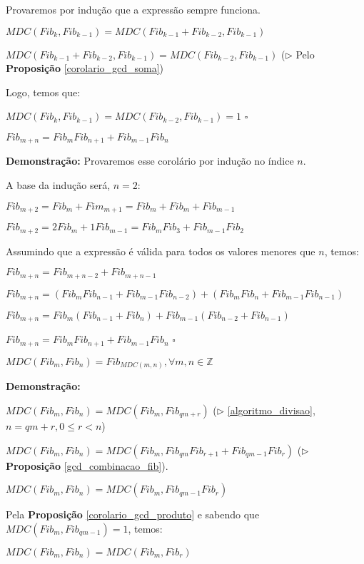 Provaremos por indução que a expressão sempre funciona.

$MDC(Fib_{k}, Fib_{k-1}) = MDC(Fib_{k-1} + Fib_{k-2}, Fib_{k-1})$

$MDC(Fib_{k-1} + Fib_{k-2}, Fib_{k-1}) = MDC(Fib_{k-2}, Fib_{k-1})$ ($\triangleright$ Pelo \textbf{Proposição} \autoref{corolario_gcd_soma})

Logo, temos que:

$MDC(Fib_{k}, Fib_{k-1}) = MDC(Fib_{k-2}, Fib_{k-1}) = 1$ $\square$



\begin{proposition}\label{gcd_combinacao_fib}
$Fib_{m+n} = Fib_mFib_{n+1} + Fib_{m-1}Fib_n$
\end{proposition}
\textbf{Demonstração:} Provaremos esse corolário por indução no índice $n$.

A base da indução será, $n=2$:

$Fib_{m+2} = Fib_m + Fim_{m+1} = Fib_m + Fib_m + Fib_{m-1}$

$Fib_{m+2} = 2Fib_m + 1Fib_{m-1} = Fib_mFib_{3} + Fib_{m-1}Fib_2$

Assumindo que a expressão é válida para todos os valores menores que $n$, temos:

$Fib_{m+n} = Fib_{m+n-2} + Fib_{m+n-1}$

$Fib_{m+n} = (Fib_{m}Fib_{n-1} + Fib_{m-1}Fib_{n-2}) + (Fib_{m}Fib_{n} + Fib_{m-1}Fib_{n-1})$

$Fib_{m+n} = Fib_m(Fib_{n-1} + Fib_{n}) + Fib_{m-1}(Fib_{n-2} + Fib_{n-1})$

$Fib_{m+n} = Fib_mFib_{n+1} + Fib_{m-1}Fib_n$ $\square$ 


\begin{theorem}\label{fibonacci_mdc}
$MDC(Fib_m, Fib_n) = Fib_{MDC(m, n)}, \forall m, n \in \mathbb{Z}$
\end{theorem}
\textbf{Demonstração:}

$MDC(Fib_m, Fib_n) = MDC(Fib_m, Fib_{qm + r})$ ($\triangleright$ \autoref{algoritmo_divisao}, $n = qm + r, 0 \leq r < n$)

$MDC(Fib_m, Fib_n) = MDC(Fib_m, Fib_{qm}Fib_{r+1} + Fib_{qm-1}Fib_{r})$ ($\triangleright$ \textbf{Proposição} \autoref{gcd_combinacao_fib}).

$MDC(Fib_m, Fib_n) = MDC(Fib_m, Fib_{qm-1}Fib_{r})$

Pela \textbf{Proposição} \autoref{corolario_gcd_produto} e sabendo que $MDC(Fib_m,Fib_{qm-1})=1$, temos:

$MDC(Fib_m, Fib_n) = MDC(Fib_m, Fib_{r})$

